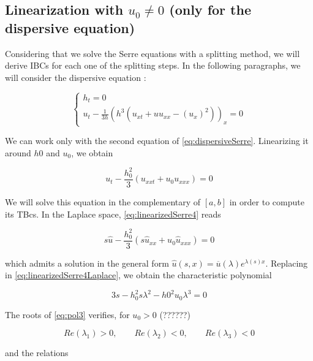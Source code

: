 \subsection{Linearization with $u_0 \neq 0$ (only for the dispersive equation)}

\indent Considering that we solve the Serre equations with a splitting method, we will derive IBCs for each one of the splitting steps. In the following paragraphs, we will consider the dispersive equation :

\begin{equation}
 \label{eq:dispersiveSerre}
	\begin{cases}
		h_t = 0 \\
		u_t - \frac{1}{3h} \left( h^3 \left( u_{xt} + uu_{xx} - (u_x)^2\right) \right)_x = 0
	\end{cases}
\end{equation}

\indent We can work only with the second equation of \eqref{eq:dispersiveSerre}. Linearizing it around $h0$ and $u_0$, we obtain

\begin{equation}
	\label{eq:linearizedSerre4}
	u_t - \frac{h_0^2}{3}(u_{xxt}+u_0u_{xxx}) = 0
\end{equation}

\indent We will solve this equation in the complementary of $[a,b]$ in order to compute its TBcs. In the Laplace space, \eqref{eq:linearizedSerre4} reads

\begin{equation}
	\label{eq:linearizedSerre4Laplace}
	s \hat{u} - \frac{h_0^2}{3}(s\hat{u}_{xx}+u_0\hat{u}_{xxx}) = 0
\end{equation}

\noindent which admits a solution in the general form $\hat{u}(s,x) = \overline{u}(\lambda)e^{\lambda(s)x}$. Replacing in \eqref{eq:linearizedSerre4Laplace}, we obtain the characteristic polynomial

\begin{equation}
\label{eq:pol3}
3s - h_0^2s\lambda^2 - h0^2u_0\lambda^3 = 0
\end{equation}

\indent The roots of \eqref{eq:pol3} verifies, for $u_0 > 0$ (??????)

\begin{equation*}
	Re(\lambda_1) > 0, \qquad Re(\lambda_2) < 0, \qquad Re(\lambda_3) < 0 
\end{equation*}

\noindent and the relations

